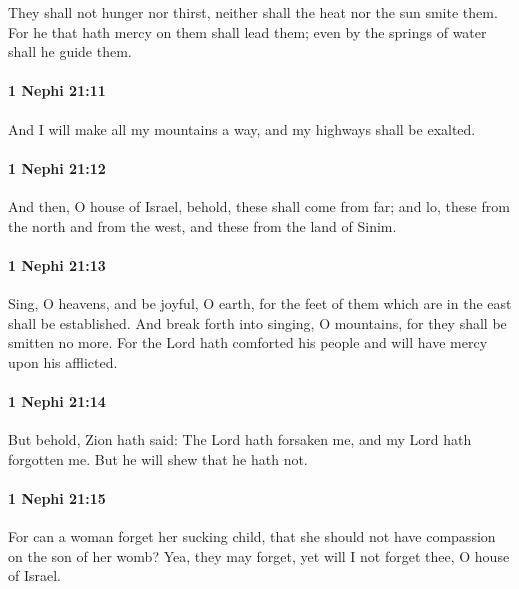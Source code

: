 			They shall not hunger nor thirst,
			neither shall the heat nor the sun smite them.
			For he that hath mercy on them shall lead them;
			even by the springs of water shall he guide them.

		\paragraph{1 Nephi 21:11} %
			\label{1NEPHI-21-11}

			And I will make all my mountains a way,
			and my highways shall be exalted.

		\paragraph{1 Nephi 21:12} %
			\label{1NEPHI-21-12}

			And then, O house of Israel,
			behold, these shall come from far;
			and lo, these from the north and from the west,
			and these from the land of Sinim.

		\paragraph{1 Nephi 21:13} %
			\label{1NEPHI-21-13}

			Sing, O heavens, and be joyful, O earth,
			for the feet of them which are in the east shall be established.
			And break forth into singing, O mountains,
			for they shall be smitten no more.
			For the Lord hath comforted his people
			and will have mercy upon his afflicted.

		\paragraph{1 Nephi 21:14} %
			\label{1NEPHI-21-14}

			But behold, Zion hath said:
			The Lord hath forsaken me,
			and my Lord hath forgotten me.
			But he will shew that he hath not.

		\paragraph{1 Nephi 21:15} %
			\label{1NEPHI-21-15}

			For can a woman forget her sucking child,
			that she should not have compassion on the son of her womb?
			Yea, they may forget,
			yet will I not forget thee, O house of Israel.


